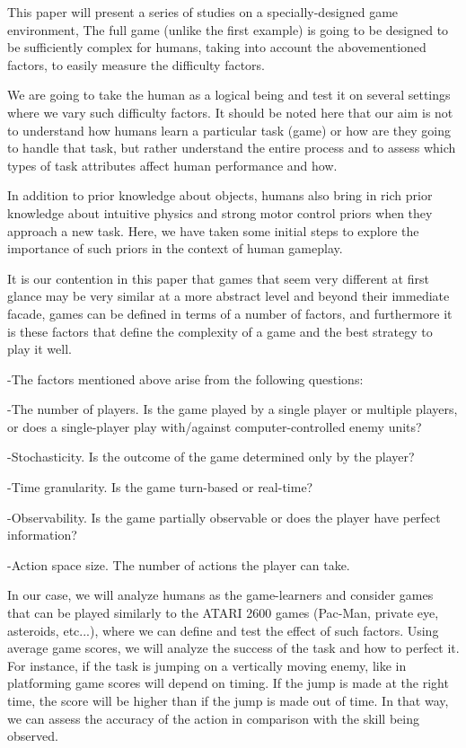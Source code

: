 This paper will present a series of studies on a specially-designed game environment, The full game (unlike the first example) is going to be designed to be sufficiently complex for humans, taking into account the abovementioned factors, to easily measure the difficulty factors.

We are going to take the human as a logical being and test it on several settings where we vary such difficulty factors. It should be noted here that our aim is not to understand how humans learn a particular task (game) or how are they going to handle that task, but rather understand the entire process and to assess which types of task attributes affect human performance and how.

In addition to prior knowledge about objects, humans also bring in rich prior knowledge about intuitive physics and strong motor control priors when they approach a new task. Here, we have taken some initial steps to explore the importance of such priors in the context of human gameplay.

It is our contention in this paper that games that seem very different at first glance may be very similar at a more abstract level and beyond their immediate facade, games can be defined in terms of a number of factors, and furthermore it is these factors that define the complexity of a game and the best strategy to play it well.

-The factors mentioned above arise from the following questions:

-The number of players. Is the game played by a single player or multiple players, or does a single-player play with/against computer-controlled enemy units?

-Stochasticity. Is the outcome of the game determined only by the player?

-Time granularity. Is the game turn-based or real-time?

-Observability. Is the game partially observable or does the player have perfect information?

-Action space size. The number of actions the player can take.


In our case, we will analyze humans as the game-learners and consider games that can be played similarly to the ATARI 2600 games (Pac-Man, private eye, asteroids, etc...), where we can define and test the effect of such factors. Using average game scores, we will analyze the success of the task and how to perfect it. 
For instance, if the task is jumping on a vertically moving enemy, like in platforming game scores will depend on timing. If the jump is made at the right time, the score will be higher than if the jump is made out of time. In that way, we can assess the accuracy of the action in comparison with the skill being observed.

